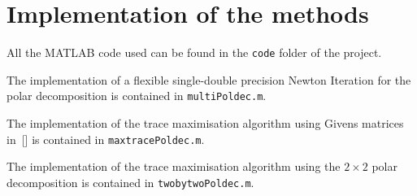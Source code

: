 \documentclass[10pt, A4paper]{article}
\begin{document}
\section{Implementation of the methods}

All the MATLAB code used can be found in the \texttt{code} folder of 
the project.

The implementation of a flexible single-double precision Newton 
Iteration for the polar decomposition is contained in 
\texttt{multiPoldec.m}.

The implementation of the trace maximisation algorithm using Givens 
matrices in~{[\citealp{smit2002}]} is contained in 
\texttt{maxtracePoldec.m}.

The implementation of the trace maximisation algorithm using the 
$2\times 2$ polar decomposition is contained in 
\texttt{twobytwoPoldec.m}.




\end{document}
